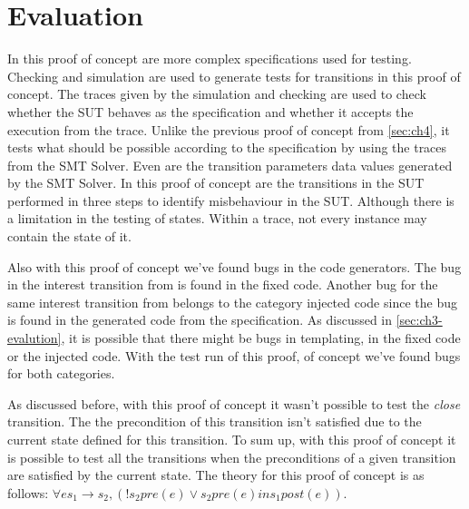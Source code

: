 
\section{Evaluation}
\label{sec:ch5-evaluation}
In this proof of concept are more complex specifications used for testing. Checking and simulation are used to generate tests for transitions in this proof of concept. The traces given by the simulation and checking are used to check whether the SUT behaves as the specification and whether it accepts the execution from the trace. Unlike the previous proof of concept from \autoref{sec:ch4}, it tests what should be possible according to the specification by using the traces from the SMT Solver. Even are the transition parameters data values generated by the SMT Solver. In this proof of concept are the transitions in the SUT performed in three steps to identify misbehaviour in the SUT. Although there is a limitation in the testing of states. Within a trace, not every instance may contain the state of it. 

Also with this proof of concept we've found bugs in the code generators. The bug in the interest transition from \label{sec:bug-interest-javadatomic} is found in the fixed code. Another bug for the same interest transition from \label{sec:bug-interest-scalaes} belongs to the category injected code since the bug is found in the generated code from the specification. As discussed in \autoref{sec:ch3-evalution}, it is possible that there might be bugs in templating, in the fixed code or the injected code. With the test run of this proof, of concept we've found bugs for both categories.

As discussed before, with this proof of concept it wasn't possible to test the \textit{close} transition. The the precondition of this transition isn't satisfied due to the current state defined for this transition. To sum up, with this proof of concept it is possible to test all the transitions when the preconditions of a given transition are satisfied by the current state. The theory for this proof of concept is as follows: $\forall e s_{1} \to s_{2}, (! s_{2} pre(e) \lor s_{2} pre(e) in s_{1} post(e))$.

